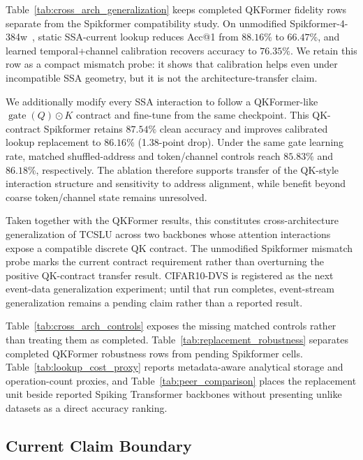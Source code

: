 Table~\ref{tab:cross_arch_generalization} keeps completed QKFormer fidelity
rows separate from the Spikformer compatibility study. On unmodified
Spikformer-4-384w~\cite{zhou2023spikformer}, static SSA-current lookup reduces
Acc@1 from $88.16\%$ to $66.47\%$, and learned temporal+channel calibration
recovers accuracy to $76.35\%$. We retain this row as a compact mismatch probe:
it shows that calibration helps even under incompatible SSA geometry, but it is
not the architecture-transfer claim.

We additionally modify every SSA interaction to follow a QKFormer-like
$\operatorname{gate}(Q)\odot K$ contract and fine-tune from the same
checkpoint. This QK-contract Spikformer retains $87.54\%$ clean accuracy and
improves calibrated lookup replacement to $86.16\%$ (1.38-point drop).
Under the same gate learning rate, matched shuffled-address and token/channel
controls reach $85.83\%$ and $86.18\%$, respectively. The ablation therefore
supports transfer of the QK-style interaction structure and sensitivity to
address alignment, while benefit beyond coarse token/channel state remains
unresolved.

Taken together with the QKFormer results, this constitutes cross-architecture
generalization of TCSLU across two backbones whose attention interactions expose
a compatible discrete QK contract. The unmodified Spikformer mismatch probe
marks the current contract requirement rather than overturning the positive
QK-contract transfer result. CIFAR10-DVS is registered as the next event-data
generalization experiment; until that run completes, event-stream
generalization remains a pending claim rather than a reported result.

Table~\ref{tab:cross_arch_controls} exposes the missing matched controls rather
than treating them as completed. Table~\ref{tab:replacement_robustness}
separates completed QKFormer robustness rows from pending Spikformer cells.
Table~\ref{tab:lookup_cost_proxy} reports metadata-aware analytical storage and
operation-count proxies, and Table~\ref{tab:peer_comparison} places the
replacement unit beside reported Spiking Transformer backbones without
presenting unlike datasets as a direct accuracy ranking.



\subsection{Current Claim Boundary}
\label{sec:claim_boundary}

